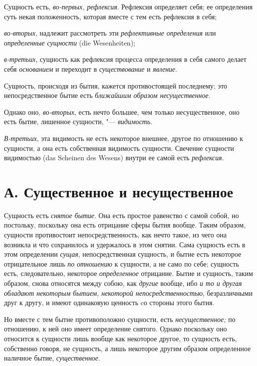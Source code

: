 Сущность есть, {\em во-первых, рефлексия}. Рефлексия определяет себя;
ее определения суть некая положенность, которая вместе с тем есть
рефлексия в себя;

{\em во-вторых}, надлежит рассмотреть эти {\em рефлективные определения} или
{\em определенные сущности} (die Wesenheiten);

{\em в-третьих}, сущность как рефлексия процесса
определения в себя самого делает себя {\em основанием}
и переходит в {\em существование} и {\em явление}.


Сущность, происходя из бытия, кажется
противостоящей последнему; это непосредственное бытие есть
{\em ближайшим образом несущественное}.

Однако оно, {\em во-вторых}, есть нечто большее, чем только
несущественное, оно есть бытие, лишенное сущности, "--- {\em видимость}.

{\em В-третьих}, эта видимость не есть некоторое
внешнее, другое по отношению к сущности, а она есть собственная видимость
сущности. Свечение сущности видимостью (das Scheinen des Wesens) внутри ее
самой есть {\em рефлексия}.

\section[А. Существенное и несущественное]{А. Существенное и несущественное}

Сущность есть {\em снятое бытие}.
Она есть простое равенство с самой собой, но постольку, поскольку
она есть отрицание сферы бытия вообще. Таким образом, сущности противостоит
непосредственность, как нечто такое, из чего она возникла и что сохранилось
и удержалось в этом снятии. Сама сущность есть в этом определении
{\em сущая}, непосредственная сущность, и бытие есть
некоторое отрицательное лишь {\em по отношению} к
сущности, а не само по себе; сущность есть, следовательно, некоторое
{\em определенное} отрицание. Бытие и сущность, таким
образом, снова относятся между собою, как {\em другие} вообще, ибо
{\em и то и другая обладают некоторым бытием, некоторой непосредственностью},
безразличными друг к другу, и имеют одинаковую ценность cо стороны этого бытия.

Но вместе с тем бытие противоположно сущности, есть
{\em несущественное;} по отношению, к ней оно имеет
определение снятого. Однако поскольку оно относится к сущности лишь вообще
как некоторое другое, то сущность есть, собственно говоря, не сущность, а
лишь некоторое другим образом определенное наличное бытие,
{\em существенное}.

